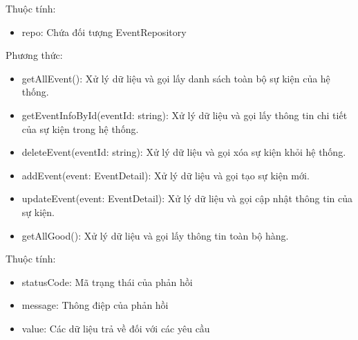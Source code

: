 Thuộc tính:
\begin{itemize}
	\item repo: Chứa đối tượng EventRepository
\end{itemize}
Phương thức:
\begin{itemize}
	\item getAllEvent(): Xử lý dữ liệu và gọi lấy danh sách toàn bộ sự kiện của hệ thống.
	\item getEventInfoById(eventId: string): Xử lý dữ liệu và gọi lấy thông tin chi tiết của sự kiện trong hệ thống.
	\item deleteEvent(eventId: string): Xử lý dữ liệu và gọi xóa sự kiện khỏi hệ thống.
	\item addEvent(event: EventDetail): Xử lý dữ liệu và gọi tạo sự kiện mới.
	\item updateEvent(event: EventDetail): Xử lý dữ liệu và gọi cập nhật thông tin của sự kiện.
	\item getAllGood(): Xử lý dữ liệu và gọi lấy thông tin toàn bộ hàng.
\end{itemize}

Thuộc tính:
\begin{itemize}
	\item statusCode: Mã trạng thái của phản hồi
	\item message: Thông điệp của phản hồi
	\item value: Các dữ liệu trả về đối với các yêu cầu
\end{itemize}


